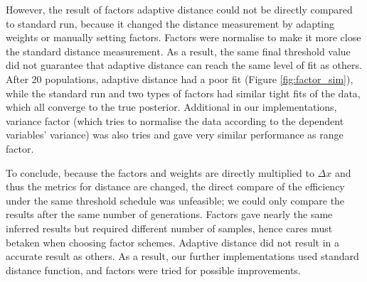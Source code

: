 However, the result of factors adaptive distance could not be directly compared to standard run, because it changed the distance measurement by adapting weights or manually setting factors. Factors were normalise to make it more close the standard distance measurement. As a result, the same final threshold value did not guarantee that adaptive distance can reach the same level of fit as others. After 20 populations, adaptive distance had a poor fit (Figure \ref{fig:factor_sim}), while the standard run and two types of factors had similar tight fits of the data, which all converge to the true posterior. Additional in our implementations, variance factor (which tries to normalise the data according to the dependent variables' variance) was also tries and gave very similar performance as range factor.

To conclude, because the factors and weights are directly multiplied to $\Delta x$ and thus the metrics for distance are changed, the direct compare of the efficiency under the same threshold schedule was unfeasible; we could only compare the results after the same number of generations. Factors gave nearly the same inferred results but required different number of samples, hence cares must betaken when choosing factor schemes. Adaptive distance did not result in a accurate result as others. As a result, our further implementations used standard distance function, and factors were tried for possible improvements.







